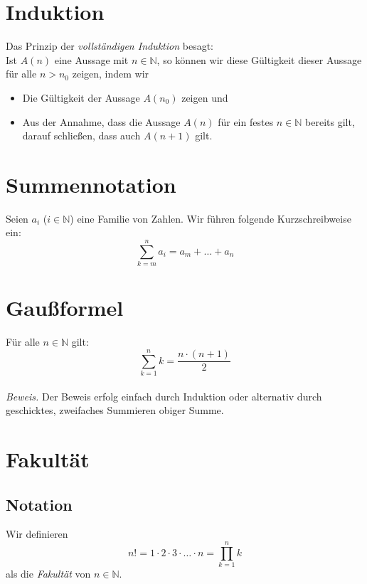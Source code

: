 \documentclass{scrreprt}
\newenvironment{proof}{\emph{\\Beweis.}}{}
\newcommand{\NN}{\mathbb{N}}
\begin{document}
    \section{Induktion}
    Das Prinzip der \emph{vollständigen Induktion} besagt: \\
    Ist $A(n)$ eine Aussage mit $n \in \NN$, so können wir diese Gültigkeit dieser Aussage für alle $n > n_0$ zeigen, indem wir
    \begin{itemize}
        \item
            Die Gültigkeit der Aussage $A(n_0)$ zeigen und
        \item
            Aus der Annahme, dass die Aussage $A(n)$ für ein festes $n \in \NN$ bereits gilt, darauf schließen, dass auch $A(n + 1)$ gilt.
    \end{itemize}

    \section{Summennotation}
    Seien $a_i$ ($i \in \NN$) eine Familie von Zahlen. Wir führen folgende Kurzschreibweise ein:
    \begin{equation*}
        \sum\limits_{k=m}^n a_i = a_m + \dots + a_n
    \end{equation*}

    \section{Gaußformel}
    Für alle $n \in \NN$ gilt: 
    \begin{equation*}
            \sum\limits_{k=1}^n k = \frac{n \cdot (n + 1)}{2}
    \end{equation*}
    \begin{proof}
        Der Beweis erfolg einfach durch Induktion oder alternativ durch geschicktes, zweifaches Summieren obiger Summe.  
    \end{proof}

    \section{Fakultät}
        \subsection{Notation}
        Wir definieren
        \begin{equation*}
            n ! = 1 \cdot 2 \cdot 3 \cdot \dots \cdot n = \prod\limits_{k=1}^n k 
        \end{equation*}
        als die \emph{Fakultät} von $n \in \NN$.
\end{document}
